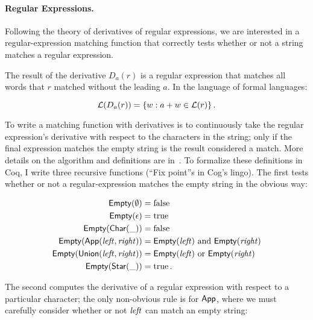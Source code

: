 \paragraph{Regular Expressions.} Following the theory of derivatives of regular
expressions, we are interested in a regular-expression matching function that
correctly tests whether or not a string matches a regular expression.

The result of the derivative \(D_a(r)\) is a regular expression that matches all
words that \(r\) matched without the leading \(a\). In the language of formal
languages:

\begin{equation*}
    \mathcal{L}(D_a(r)) = \left\{ w : a + w \in \mathcal{L}(r)\right\}.
\end{equation*}

To write a matching function with derivatives is to continuously take the
regular expression's derivative with respect to the characters in the string;
only if the final expression matches the empty string is the result considered a
match. More details on the algorithm and definitions are
in~\cite{Might_Yacc,Might_desugar,Might_deriv}. To formalize these definitions
in Coq, I write three recursive functions (``Fix point''s in Cog's lingo). The
first tests whether or not a regular-expression matches the empty string in the
obvious way:

\begin{align*}
    \mathsf{Empty}(\emptyset) &= \operatorname{false} \\
    \mathsf{Empty}(\epsilon) &= \operatorname{true} \\
    \mathsf{Empty}(\mathsf{Char}(\_)) &= \operatorname{false} \\
    \mathsf{Empty}(\mathsf{App}(\mathit{left}, \mathit{right})) &=
        \mathsf{Empty}(\mathit{left}) \text{ and } \mathsf{Empty}(\mathit{right}) \\
    \mathsf{Empty}(\mathsf{Union}(\mathit{left}, \mathit{right})) &=
        \mathsf{Empty}(\mathit{left}) \text{ or } \mathsf{Empty}(\mathit{right}) \\
    \mathsf{Empty}(\mathsf{Star}(\_)) &= \operatorname{true}.
\end{align*}

The second computes the derivative of a regular expression with respect to a
particular character; the only non-obvious rule is for \(\mathsf{App}\), where we
must carefully consider whether or not \(\mathit{left}\) can match an empty string:

